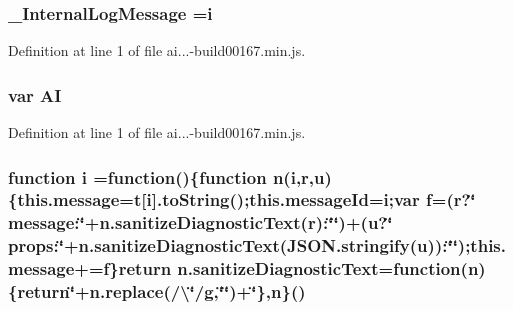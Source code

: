 \subsubsection[{\texorpdfstring{\+\_\+\+Internal\+Log\+Message}{_InternalLogMessage}}]{ \+\_\+\+Internal\+Log\+Message ={\bf i}}\hypertarget{obj_2_release_2_package_2_package_tmp_2_scripts_2ai_80_822_89-build00167_8min_8js_adad583a6bcc3922dc325bdc4f9f08df3}{}\label{obj_2_release_2_package_2_package_tmp_2_scripts_2ai_80_822_89-build00167_8min_8js_adad583a6bcc3922dc325bdc4f9f08df3}


Definition at line 1 of file ai...-\/build00167.\+min.\+js.

\subsubsection[{\texorpdfstring{AI}{AI}}]{\setlength{\rightskip}{0pt plus 5cm}var AI}\hypertarget{obj_2_release_2_package_2_package_tmp_2_scripts_2ai_80_822_89-build00167_8min_8js_a55ad59345b2b1d61457e94250a7d7957}{}\label{obj_2_release_2_package_2_package_tmp_2_scripts_2ai_80_822_89-build00167_8min_8js_a55ad59345b2b1d61457e94250a7d7957}


Definition at line 1 of file ai...-\/build00167.\+min.\+js.

\subsubsection[{\texorpdfstring{i}{i}}]{\setlength{\rightskip}{0pt plus 5cm}function i =function()\{function {\bf n}(i,{\bf r},{\bf u})\{this.\+message={\bf t}\mbox{[}i\mbox{]}.to\+String();this.\+message\+Id=i;var {\bf f}=({\bf r}?\char`\"{} message\+:\char`\"{}+n.\+sanitize\+Diagnostic\+Text({\bf r})\+:\char`\"{}\char`\"{})+({\bf u}?\char`\"{} props\+:\char`\"{}+n.\+sanitize\+Diagnostic\+Text(J\+S\+O\+N.\+stringify({\bf u}))\+:\char`\"{}\char`\"{});this.\+message+={\bf f}\}return n.\+sanitize\+Diagnostic\+Text=function({\bf n})\{return\textquotesingle{}\char`\"{}\textquotesingle{}+n.\+replace(/\textbackslash{}\char`\"{}/g,\char`\"{}\char`\"{})+\textquotesingle{}\char`\"{}\textquotesingle{}\},n\}()}\hypertarget{obj_2_release_2_package_2_package_tmp_2_scripts_2ai_80_822_89-build00167_8min_8js_aba29173262d28394924f99eb2ed5b31b}{}\label{obj_2_release_2_package_2_package_tmp_2_scripts_2ai_80_822_89-build00167_8min_8js_aba29173262d28394924f99eb2ed5b31b}


